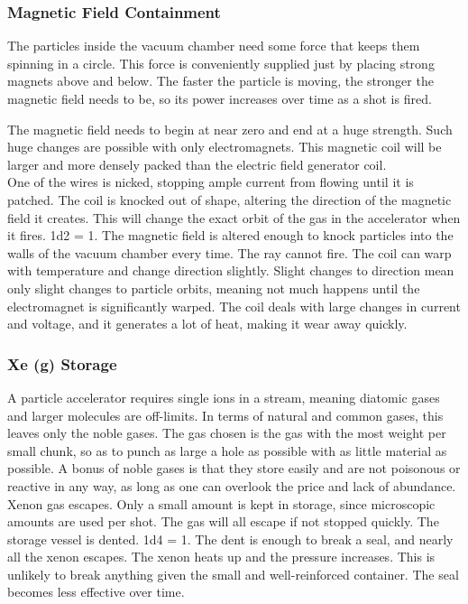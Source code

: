 \documentclass[a4paper]{article}
\begin{document}
\vspace{-0.5cm} \hspace{-18pt} \subsubsection{Magnetic Field Containment} \label{ray_containment} \vspace{-0.2cm}
The particles inside the vacuum chamber need some force that keeps them spinning in a circle. This force is conveniently supplied just by placing strong magnets above and below. The faster the particle is moving, the stronger the magnetic field needs to be, so its power increases over time as a shot is fired.

The magnetic field needs to begin at near zero and end at a huge strength. Such huge changes are possible with only electromagnets. This magnetic coil will be larger and more densely packed than the electric field generator coil. 
\\ \pbhw
{One of the wires is nicked, stopping ample current from flowing until it is patched.}
{The coil is knocked out of shape, altering the direction of the magnetic field it creates. This will change the exact orbit of the gas in the accelerator when it fires. \newline 1d2 = 1. The magnetic field is altered enough to knock particles into the walls of the vacuum chamber every time. The ray cannot fire.}
{The coil can warp with temperature and change direction slightly. Slight changes to direction mean only slight changes to particle orbits, meaning not much happens until the electromagnet is significantly warped.}
{The coil deals with large changes in current and voltage, and it generates a lot of heat, making it wear away quickly.}


\vspace{-0.5cm} \hspace{-18pt} \subsubsection{Xe (g) Storage} \label{ray_xe_storage} \vspace{-0.2cm}
A particle accelerator requires single ions in a stream, meaning diatomic gases and larger molecules are off-limits. In terms of natural and common gases, this leaves only the noble gases. The gas chosen is the gas with the most weight per small chunk, so as to punch as large a hole as possible with as little material as possible. A bonus of noble gases is that they store easily and are not poisonous or reactive in any way, as long as one can overlook the price and lack of abundance.
\\ \pbhw
{Xenon gas escapes. Only a small amount is kept in storage, since microscopic amounts are used per shot. The gas will all escape if not stopped quickly.}
{The storage vessel is dented. \newline \hspace{3pt} 1d4 = 1. The dent is enough to break a seal, and nearly all the xenon escapes.}
{The xenon heats up and the pressure increases. This is unlikely to break anything given the small and well-reinforced container.}
{The seal becomes less effective over time.}
\end{document}
